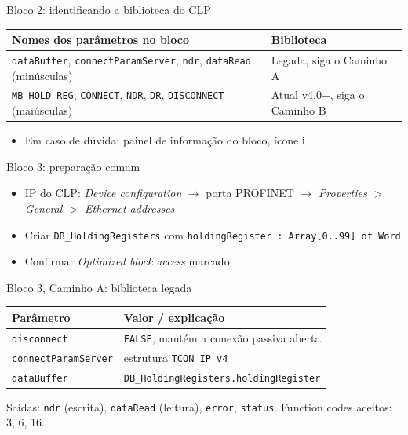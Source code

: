 \documentclass[12pt, aspectratio=169]{beamer}
\newcommand{\tblhead}[1]{\textcolor{TextPrimary}{\textbf{#1}}}
\begin{document}
\begin{frame}{Bloco 2: identificando a biblioteca do CLP}
  \vspace{0.35cm}
  \begin{tabularx}{\textwidth}{@{}X X@{}}
    \rowcolor{PanelEdge}
    \tblhead{Nomes dos parâmetros no bloco} & \tblhead{Biblioteca} \\
    \midrule
    \rowcolor{PanelBg}
    \texttt{dataBuffer}, \texttt{connectParamServer}, \texttt{ndr}, \texttt{dataRead} (minúsculas) &
    Legada, siga o Caminho A \\
    \rowcolor{PanelBg}
    \texttt{MB\_HOLD\_REG}, \texttt{CONNECT}, \texttt{NDR}, \texttt{DR}, \texttt{DISCONNECT} (maiúsculas) &
    Atual v4.0+, siga o Caminho B \\
  \end{tabularx}

  \vspace{0.35cm}
  \begin{itemize}
    \item Em caso de dúvida: painel de informação do bloco, ícone \textbf{i}
  \end{itemize}
\end{frame}

\begin{frame}{Bloco 3: preparação comum}
  \vspace{0.4cm}
  \begin{itemize}
    \item IP do CLP: \emph{Device configuration} $\to$ porta PROFINET $\to$ \emph{Properties $>$ General $>$ Ethernet addresses}
    \item Criar \texttt{DB\_HoldingRegisters} com \texttt{holdingRegister : Array[0..99] of Word}
    \item Confirmar \emph{Optimized block access} marcado
  \end{itemize}
\end{frame}

\begin{frame}{Bloco 3, Caminho A: biblioteca legada}
  \vspace{0.3cm}
  \begin{tabularx}{\textwidth}{@{}l X@{}}
    \rowcolor{PanelEdge}
    \tblhead{Parâmetro} & \tblhead{Valor / explicação} \\
    \midrule
    \rowcolor{PanelBg}
    \texttt{disconnect} & \texttt{FALSE}, mantém a conexão passiva aberta \\
    \rowcolor{PanelBg}
    \texttt{connectParamServer} & estrutura \texttt{TCON\_IP\_v4} \\
    \rowcolor{PanelBg}
    \texttt{dataBuffer} & \texttt{DB\_HoldingRegisters.holdingRegister} \\
  \end{tabularx}

  \vspace{0.25cm}
  Saídas: \texttt{ndr} (escrita), \texttt{dataRead} (leitura), \texttt{error}, \texttt{status}.
  Function codes aceitos: 3, 6, 16.
\end{frame}
\end{document}
